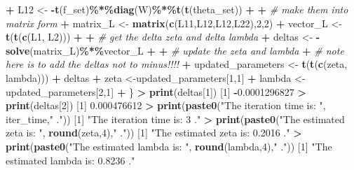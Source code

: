 \documentclass[
]{article}
\newenvironment{Shaded}{\begin{snugshade}}{\end{snugshade}}
\newcommand{\CommentTok}[1]{\textcolor[rgb]{0.56,0.35,0.01}{\textit{#1}}}
\newcommand{\DecValTok}[1]{\textcolor[rgb]{0.00,0.00,0.81}{#1}}
\newcommand{\FloatTok}[1]{\textcolor[rgb]{0.00,0.00,0.81}{#1}}
\newcommand{\FunctionTok}[1]{\textcolor[rgb]{0.13,0.29,0.53}{\textbf{#1}}}
\newcommand{\NormalTok}[1]{#1}
\newcommand{\OtherTok}[1]{\textcolor[rgb]{0.56,0.35,0.01}{#1}}
\newcommand{\SpecialCharTok}[1]{\textcolor[rgb]{0.81,0.36,0.00}{\textbf{#1}}}
\newcommand{\StringTok}[1]{\textcolor[rgb]{0.31,0.60,0.02}{#1}}
\begin{document}
\begin{Shaded}
\begin{Highlighting}[]
\SpecialCharTok{+}\NormalTok{   L12 }\OtherTok{\textless{}{-}} \SpecialCharTok{{-}}\FunctionTok{t}\NormalTok{(f\_set)}\SpecialCharTok{\%*\%}\FunctionTok{diag}\NormalTok{(W)}\SpecialCharTok{\%*\%}\FunctionTok{t}\NormalTok{(}\FunctionTok{t}\NormalTok{(theta\_set))}
\SpecialCharTok{+}   
\SpecialCharTok{+}   \CommentTok{\# make them into matrix form}
\SpecialCharTok{+}\NormalTok{   matrix\_L }\OtherTok{\textless{}{-}} \FunctionTok{matrix}\NormalTok{(}\FunctionTok{c}\NormalTok{(L11,L12,L12,L22),}\DecValTok{2}\NormalTok{,}\DecValTok{2}\NormalTok{)}
\SpecialCharTok{+}\NormalTok{   vector\_L }\OtherTok{\textless{}{-}} \FunctionTok{t}\NormalTok{(}\FunctionTok{t}\NormalTok{(}\FunctionTok{c}\NormalTok{(L1, L2)))}
\SpecialCharTok{+}   
\SpecialCharTok{+}   \CommentTok{\# get the delta zeta and delta lambda}
\SpecialCharTok{+}\NormalTok{   deltas }\OtherTok{\textless{}{-}} \SpecialCharTok{{-}}\FunctionTok{solve}\NormalTok{(matrix\_L)}\SpecialCharTok{\%*\%}\NormalTok{vector\_L}
\SpecialCharTok{+}   
\SpecialCharTok{+}   \CommentTok{\# update the zeta and lambda}
\SpecialCharTok{+}   \CommentTok{\# note here is to add the deltas not to minus!!!!}
\SpecialCharTok{+}\NormalTok{   updated\_parameters }\OtherTok{\textless{}{-}} \FunctionTok{t}\NormalTok{(}\FunctionTok{t}\NormalTok{(}\FunctionTok{c}\NormalTok{(zeta, lambda))) }\SpecialCharTok{+}\NormalTok{ deltas}
\SpecialCharTok{+}\NormalTok{   zeta }\OtherTok{\textless{}{-}}\NormalTok{updated\_parameters[}\DecValTok{1}\NormalTok{,}\DecValTok{1}\NormalTok{]}
\SpecialCharTok{+}\NormalTok{   lambda }\OtherTok{\textless{}{-}}\NormalTok{ updated\_parameters[}\DecValTok{2}\NormalTok{,}\DecValTok{1}\NormalTok{]}
\SpecialCharTok{+}\NormalTok{ \}}
\SpecialCharTok{\textgreater{}} \FunctionTok{print}\NormalTok{(deltas[}\DecValTok{1}\NormalTok{])}
\NormalTok{[}\DecValTok{1}\NormalTok{] }\SpecialCharTok{{-}}\FloatTok{0.0001296827}
\SpecialCharTok{\textgreater{}} \FunctionTok{print}\NormalTok{(deltas[}\DecValTok{2}\NormalTok{])}
\NormalTok{[}\DecValTok{1}\NormalTok{] }\FloatTok{0.000476612}
\SpecialCharTok{\textgreater{}} \FunctionTok{print}\NormalTok{(}\FunctionTok{paste0}\NormalTok{(}\StringTok{"The iteration time is: "}\NormalTok{, iter\_time,}\StringTok{" ."}\NormalTok{))}
\NormalTok{[}\DecValTok{1}\NormalTok{] }\StringTok{"The iteration time is: 3 ."}
\SpecialCharTok{\textgreater{}} \FunctionTok{print}\NormalTok{(}\FunctionTok{paste0}\NormalTok{(}\StringTok{"The estimated zeta is: "}\NormalTok{, }\FunctionTok{round}\NormalTok{(zeta,}\DecValTok{4}\NormalTok{),}\StringTok{" ."}\NormalTok{))}
\NormalTok{[}\DecValTok{1}\NormalTok{] }\StringTok{"The estimated zeta is: 0.2016 ."}
\SpecialCharTok{\textgreater{}} \FunctionTok{print}\NormalTok{(}\FunctionTok{paste0}\NormalTok{(}\StringTok{"The estimated lambda is: "}\NormalTok{, }\FunctionTok{round}\NormalTok{(lambda,}\DecValTok{4}\NormalTok{),}\StringTok{" ."}\NormalTok{))}
\NormalTok{[}\DecValTok{1}\NormalTok{] }\StringTok{"The estimated lambda is: 0.8236 ."}
\end{Highlighting}
\end{Shaded}
\end{document}

